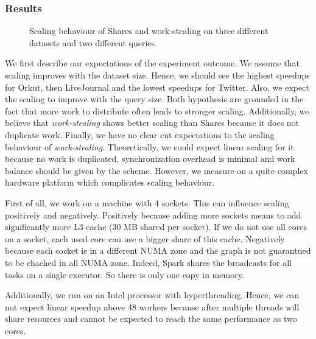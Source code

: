 \subsubsection{Results}

\begin{figure}
    \centering
    \newline
    \caption{Scaling behaviour of Shares and work-stealing on three different datasets
      and two different queries.}
    \label{fig:graphWCOJ-scaling}
\end{figure}


We first describe our expectations of the experiment outcome.
We assume that scaling improves with the dataset size.
Hence, we should see the highest speedups for Orkut, then LiveJournal and the lowest speedups for Twitter.
Also, we expect the scaling to improve with the query size.
Both hypothesis are grounded in the fact that more work to distribute often leads to stronger scaling.
Additionally, we believe that \textit{work-stealing} shows better scaling than Shares because it does not duplicate work.
Finally, we have no clear cut expectations to the scaling behaviour of \textit{work-stealing}.
Theoretically, we could expect linear scaling for it because no work is duplicated, synchronization overhead is minimal and
work balance should be given by the scheme.
However, we measure on a quite complex hardware platform which complicates scaling behaviour.

First of all, we work on a machine with 4 sockets.
This can influence scaling positively and negatively.
Positively because adding more sockets means to add significantly more L3 cache (30 MB shared per socket).
If we do not use all cores on a socket, each used core can use a bigger share of this cache.
Negatively because each socket is in a different NUMA zone and the graph is not guarantued to be chached in all
NUMA zone.
Indeed, Spark shares the broadcasts for all tasks on a single executor.
So there is only one copy in memory. %

Additionally, we run on an Intel processor with hyperthreading.
Hence, we can not expect linear speedup above 48 workers because after multiple threads will share resources and cannot be
expected to reach the same performance as two cores.

